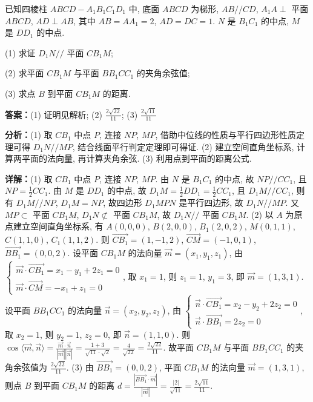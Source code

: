 \begin{question}[points=15]
已知四棱柱 $ABCD-A_1B_1C_1D_1$ 中, 底面 $ABCD$ 为梯形, $AB//CD$, $A_1A\perp$ 平面 $ABCD$, $AD\perp AB$, 其中 $AB=AA_1=2$, $AD=DC=1$. $N$ 是 $B_1C_1$ 的中点, $M$ 是 $DD_1$ 的中点.

(1) 求证 $D_1N//$ 平面 $CB_1M$;

(2) 求平面 $CB_1M$ 与平面 $BB_1CC_1$ 的夹角余弦值;

(3) 求点 $B$ 到平面 $CB_1M$ 的距离.
\begin{solution}
\textbf{答案：}(1) 证明见解析; (2) $\frac{2\sqrt{22}}{11}$; (3) $\frac{2\sqrt{11}}{11}$

\textbf{分析：}(1) 取 $CB_1$ 中点 $P$, 连接 $NP$, $MP$, 借助中位线的性质与平行四边形性质定理可得 $D_1N//MP$, 结合线面平行判定定理即可得证. (2) 建立空间直角坐标系, 计算两平面的法向量, 再计算夹角余弦. (3) 利用点到平面的距离公式.

\textbf{详解：}(1) 取 $CB_1$ 中点 $P$, 连接 $NP$, $MP$. 由 $N$ 是 $B_1C_1$ 的中点, 故 $NP//CC_1$, 且 $NP=\frac{1}{2}CC_1$. 由 $M$ 是 $DD_1$ 的中点, 故 $D_1M=\frac{1}{2}DD_1=\frac{1}{2}CC_1$, 且 $D_1M//CC_1$, 则有 $D_1M//NP$, $D_1M=NP$, 故四边形 $D_1MPN$ 是平行四边形, 故 $D_1N//MP$. 又 $MP\subset$ 平面 $CB_1M$, $D_1N\not\subset$ 平面 $CB_1M$, 故 $D_1N//$ 平面 $CB_1M$.
(2) 以 $A$ 为原点建立空间直角坐标系, 有 $A(0,0,0)$, $B(2,0,0)$, $B_1(2,0,2)$, $M(0,1,1)$, $C(1,1,0)$, $C_1(1,1,2)$. 则 $\overrightarrow{CB_1}=(1,-1,2)$, $\overrightarrow{CM}=(-1,0,1)$, $\overrightarrow{BB_1}=(0,0,2)$. 设平面 $CB_1M$ 的法向量 $\vec{m}=(x_1,y_1,z_1)$, 由 $\begin{cases} \vec{m}\cdot\overrightarrow{CB_1}=x_1-y_1+2z_1=0\\ \vec{m}\cdot\overrightarrow{CM}=-x_1+z_1=0 \end{cases}$, 取 $x_1=1$, 则 $z_1=1$, $y_1=3$, 即 $\vec{m}=(1,3,1)$. 设平面 $BB_1CC_1$ 的法向量 $\vec{n}=(x_2,y_2,z_2)$, 由 $\begin{cases} \vec{n}\cdot\overrightarrow{CB_1}=x_2-y_2+2z_2=0\\ \vec{n}\cdot\overrightarrow{BB_1}=2z_2=0 \end{cases}$, 取 $x_2=1$, 则 $y_2=1$, $z_2=0$, 即 $\vec{n}=(1,1,0)$. 则 $\cos\langle\vec{m},\vec{n}\rangle=\frac{\vec{m}\cdot\vec{n}}{|\vec{m}||\vec{n}|}=\frac{1+3}{\sqrt{11}\cdot\sqrt{2}}=\frac{4}{\sqrt{22}}=\frac{2\sqrt{22}}{11}$. 故平面 $CB_1M$ 与平面 $BB_1CC_1$ 的夹角余弦值为 $\frac{2\sqrt{22}}{11}$.
(3) 由 $\overrightarrow{BB_1}=(0,0,2)$, 平面 $CB_1M$ 的法向量 $\vec{m}=(1,3,1)$, 则点 $B$ 到平面 $CB_1M$ 的距离 $d=\frac{|\overrightarrow{BB_1}\cdot\vec{m}|}{|\vec{m}|}=\frac{|2|}{\sqrt{11}}=\frac{2\sqrt{11}}{11}$.
\end{solution}
\end{question}

